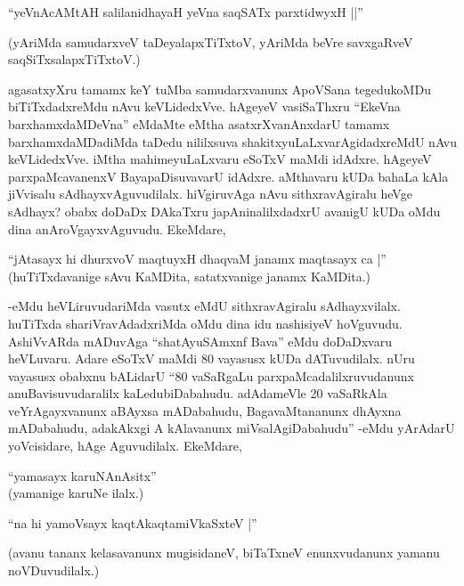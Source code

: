 \begin{shloka}
``yeVnAcAMtAH salilanidhayaH yeVna saqSATx parxtidwyxH ||''
\end{shloka}

(yAriMda samudarxveV taDeyalapxTiTxtoV, yAriMda beVre savxgaRveV saqSiTxsalapxTiTxtoV.)

agasatxyXru tamamx keY tuMba samudarxvanunx ApoVSana tegedukoMDu biTiTxdadxreMdu nAvu keVLidedxVve. hAgeyeV vasiSaThxru ``EkeVna barxhamxdaMDeVna'' eMdaMte eMtha asatxrXvanAnxdarU tamamx barxhamxdaMDadiMda taDedu nililxsuva shakitxyuLaLxvarAgidadxreMdU nAvu keVLidedxVve. iMtha mahimeyuLaLxvaru eSoTxV maMdi idAdxre. hAgeyeV parxpaMcavanenxV BayapaDisuvavarU idAdxre. aMthavaru kUDa bahaLa kAla jiVvisalu sAdhayxvAguvudilalx. hiVgiruvAga nAvu sithxravAgiralu heVge sAdhayx? obabx doDaDx DAkaTxru japAninalilxdadxrU avanigU kUDa oMdu dina anAroVgayxvAguvudu. EkeMdare,

\begin{shloka}
``jAtasayx hi dhurxvoV maqtuyxH dhaqvaM janamx maqtasayx ca |''\\
(huTiTxdavanige sAvu KaMDita, satatxvanige janamx KaMDita.)
\end{shloka}

-eMdu heVLiruvudariMda vasutx eMdU sithxravAgiralu sAdhayxvilalx. huTiTxda shariVravAdadxriMda oMdu dina idu nashisiyeV hoVguvudu. AshiVvARda mADuvAga ``shatAyuSAmxnf Bava'' eMdu doDaDxvaru heVLuvaru. Adare eSoTxV maMdi 80 vayasusx kUDa dATuvudilalx. nUru vayasusx obabxnu bALidarU ``80 vaSaRgaLu parxpaMcadalilxruvudanunx anuBavisuvudaralilx kaLedubiDabahudu. adAdameVle 20 vaSaRkAla veYrAgayxvanunx aBAyxsa mADabahudu, BagavaMtananunx dhAyxna mADabahudu, adakAkxgi A kAlavanunx miVsalAgiDabahudu'' -eMdu yArAdarU yoVcisidare, hAge Aguvudilalx. EkeMdare,

\begin{shloka}
``yamasayx karuNAnAsitx''\\
(yamanige karuNe ilalx.)
\end{shloka}

\begin{shloka}
``na hi yamoV\s sayx kaqtAkaqtamiVkaSxteV |''
\end{shloka}

(avanu tananx kelasavanunx mugisidaneV, biTaTxneV enunxvudanunx yamanu noVDuvudilalx.)

